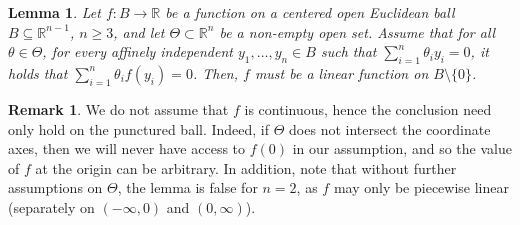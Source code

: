 \documentclass[11pt]{article}
\newtheorem{lemma}[thm]{Lemma}
\theoremstyle{definition}
\newtheorem{rem}[thm]{\textbf{Remark}}
\theoremstyle{proof}
\DeclareMathOperator{\+}{\mathop{\tilde{+}}}
\newcommand{\R}{\mathbb{R}}
\numberwithin{equation}{section}
\numberwithin{equation}{section}
\begin{document}
\begin{lemma} \label{lem:linear}
Let $f : B \rightarrow \R$ be a function on a centered open Euclidean ball $B \subseteq \R^{n-1}$, $n \geq 3$, and let $\Theta \subset \R^n$ be a non-empty open set. Assume that for all $\theta \in \Theta$,
for every affinely independent $y_1,\ldots,y_n \in B$ such that $\sum_{i=1}^n \theta_i y_i = 0$, it holds that $\sum_{i=1}^n \theta_i f(y_i) = 0$. 
Then, $f$ must be a linear function on $B \setminus \{0\}$.   
\end{lemma}
\begin{rem}
We do not assume that $f$ is continuous, hence the conclusion need only hold on the punctured ball. Indeed, if $\Theta$ does not intersect the coordinate axes, then we will never have access to $f(0)$ in our assumption, and so the value of $f$ at the origin can be arbitrary. In addition, note that without further assumptions on $\Theta$, the lemma is false for $n=2$, as $f$ may only be piecewise linear (separately on $(-\infty,0)$ and $(0,\infty)$). 
\end{rem}
\end{document}
